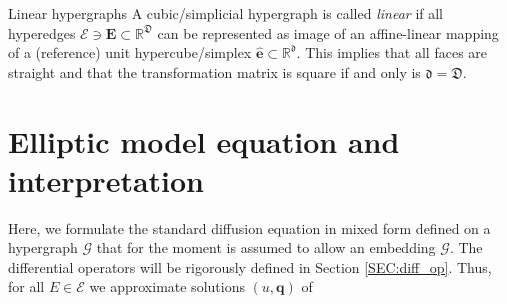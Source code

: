 \documentclass[a4paper, english, 12pt, reqno, draft]{amsart}
\makeatletter
\theoremstyle{definition}
\theoremstyle{remark}
\numberwithin{equation}{section}
\newcommand{\graph}{\ensuremath{\mathcal G}}
\newcommand{\setEdge}{\ensuremath{\mathcal E}}
\newcommand{\edge}{\ensuremath{E}}
\newcommand{\Graph}{\ensuremath{\boldsymbol{\mathcal G}}}
\newcommand{\SetEdge}{\ensuremath{\boldsymbol{\mathcal E}}}
\newcommand{\Edge}{{\ensuremath{\boldsymbol E}}}
\newcommand{\RefEdge}{{\ensuremath{\widehat{\boldsymbol e}}}}
\newcommand{\locDim}{\ensuremath{\mathfrak d}}
\newcommand{\globDim}{\ensuremath{\mathfrak D}}
\newcommand{\IR}{\ensuremath{\mathbb R}}
\renewcommand{\vec}[1]{\ensuremath{\boldsymbol{#1}}}
\def\paragraph{\@startsection{paragraph}{4}%
  \z@\z@{-\fontdimen2\font}%
  {\normalfont\scshape}}
\makeatother
\begin{document}
\paragraph{Linear hypergraphs}
% 
A cubic/simplicial hypergraph is called \emph{linear} if all hyperedges $\SetEdge \ni \Edge \subset \IR^\globDim$ can be represented as image of an affine-linear mapping of a (reference) unit hypercube/simplex $\RefEdge \subset \IR^\locDim$. This implies that all faces are straight and that the transformation matrix is square if and only is $\locDim = \globDim$.
\section{Elliptic model equation and interpretation}\label{SEC:model_eq}
% 
Here, we formulate the standard diffusion equation in mixed form defined on a hypergraph $\graph$ that for the moment is assumed to allow an embedding $\Graph$. The differential operators will be rigorously defined in Section \ref{SEC:diff_op}. Thus, for all $\edge \in \setEdge$ we approximate solutions $(u, \vec q)$ of
% 
\end{document}
